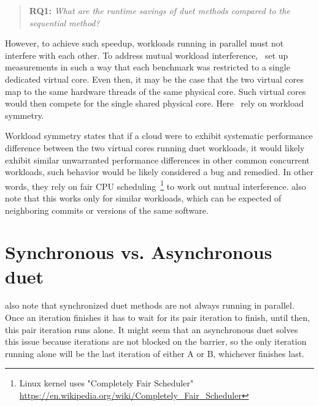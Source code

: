 \begin{quote}
	\textbf{RQ1:} \emph{What are the runtime savings of duet methods compared to the sequential method?}
\end{quote}

However, to achieve such speedup, workloads running in parallel must not interfere with each other.
To address mutual workload interference,~\citet{bulej2020duet} set up measurements in such a way that each benchmark was restricted to a single dedicated virtual core.
Even then, it may be the case that the two virtual cores map to the same hardware threads of the same physical core.
Such virtual cores would then compete for the single shared physical core.
Here~\citet{bulej2019initial} rely on workload symmetry.

Workload symmetry states that if a cloud were to exhibit systematic performance difference between the two virtual cores running duet workloads, it would likely exhibit similar unwarranted performance differences in other common concurrent workloads, such behavior would be likely considered a bug and remedied.
In other words, they rely on fair CPU scheduling~\footnote{Linux kernel uses "Completely Fair Scheduler" \url{https://en.wikipedia.org/wiki/Completely_Fair_Scheduler}} to work out mutual interference.
\citet{bulej2019initial} also note that this works only for similar workloads, which can be expected of neighboring commits or versions of the same software.


\section{Synchronous vs. Asynchronous duet}

 also note that synchronized duet methods are not always running in parallel.
Once an iteration finishes it has to wait for its pair iteration to finish, until then, this pair iteration runs alone.
It might seem that an asynchronous duet solves this issue because iterations are not blocked on the barrier, so the only iteration running alone will be the last iteration of either A or B, whichever finishes last.


